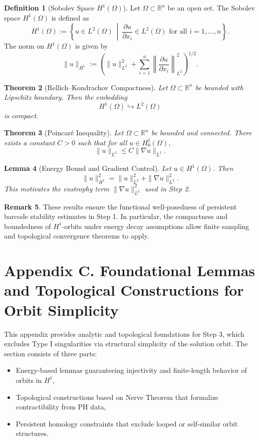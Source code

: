 \documentclass[11pt]{article}
\newtheorem{theorem}{Theorem}[section]
\newtheorem{lemma}[theorem]{Lemma}
\theoremstyle{definition}
\newtheorem{definition}[theorem]{Definition}
\newtheorem{remark}[theorem]{Remark}
\begin{document}
\begin{definition}[Sobolev Space \( H^1(\Omega) \)]
Let \( \Omega \subset \mathbb{R}^n \) be an open set. The Sobolev space \( H^1(\Omega) \) is defined as
\[
H^1(\Omega) := \left\{ u \in L^2(\Omega) \ \middle| \ \frac{\partial u}{\partial x_i} \in L^2(\Omega) \text{ for all } i = 1,\dots,n \right\}.
\]
The norm on \( H^1(\Omega) \) is given by
\[
\|u\|_{H^1} := \left( \|u\|_{L^2}^2 + \sum_{i=1}^n \left\| \frac{\partial u}{\partial x_i} \right\|_{L^2}^2 \right)^{1/2}.
\]
\end{definition}

\begin{theorem}[Rellich–Kondrachov Compactness]
Let \( \Omega \subset \mathbb{R}^n \) be bounded with Lipschitz boundary. Then the embedding
\[
H^1(\Omega) \hookrightarrow L^2(\Omega)
\]
is compact.
\end{theorem}

\begin{theorem}[Poincaré Inequality]
Let \( \Omega \subset \mathbb{R}^n \) be bounded and connected. There exists a constant \( C > 0 \) such that for all \( u \in H^1_0(\Omega) \),
\[
\|u\|_{L^2} \leq C \|\nabla u\|_{L^2}.
\]
\end{theorem}

\begin{lemma}[Energy Bound and Gradient Control]
Let \( u \in H^1(\Omega) \). Then
\[
\|u\|_{H^1}^2 = \|u\|_{L^2}^2 + \|\nabla u\|_{L^2}^2.
\]
This motivates the enstrophy term \( \|\nabla u\|_{L^2}^2 \) used in Step 2.
\end{lemma}

\begin{remark}
These results ensure the functional well-posedness of persistent barcode stability estimates in Step 1. In particular, the compactness and boundedness of \( H^1 \)-orbits under energy decay assumptions allow finite sampling and topological convergence theorems to apply.
\end{remark}


\section*{Appendix C. Foundational Lemmas and Topological Constructions for Orbit Simplicity}
\label{sec:appendixC}

This appendix provides analytic and topological foundations for Step 3, which excludes Type I singularities via structural simplicity of the solution orbit. The section consists of three parts:
\begin{itemize}
  \item[\textbf{C.1}] Energy-based lemmas guaranteeing injectivity and finite-length behavior of orbits in \( H^1 \),
  \item[\textbf{C.2}] Topological constructions based on Nerve Theorem that formalize contractibility from PH data,
  \item[\textbf{C.3}] Persistent homology constraints that exclude looped or self-similar orbit structures.
\end{itemize}
\end{document}
